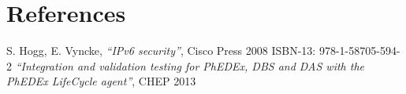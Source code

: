 \section*{References}

\begin{thebibliography}{1}
 S. Hogg, E. Vyncke,
    {\it ``IPv6 security''}, Cisco Press 2008 ISBN-13: 978-1-58705-594-2
    {\it ``Integration and validation testing for PhEDEx, DBS and DAS with the PhEDEx LifeCycle agent''}, CHEP 2013
\end{thebibliography}
